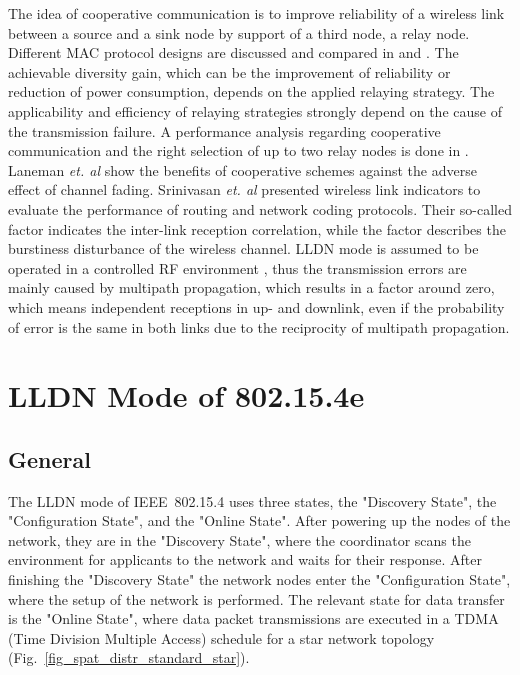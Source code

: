 \documentclass[times,10pt,twocolumn]{article}
\begin{document}
The idea of cooperative communication is to improve reliability of a wireless link between a source and a sink node by support of a third node, a relay node. Different MAC protocol designs are discussed and compared in \cite{cooperative_diversity_in_WLAN_and_WSN} and \cite{cooperative_protocols_survey}. The achievable diversity gain, which can be the improvement of reliability or reduction of power consumption, depends on the applied relaying strategy. The applicability and efficiency of relaying strategies strongly depend on the cause of the transmission failure. A performance analysis regarding cooperative communication and the right selection of up to two relay nodes is done in \cite{performance_of_relay_selection}. Laneman \textit{et. al} \cite{cooperative_diversity} show the benefits of cooperative schemes against the adverse effect of channel fading. Srinivasan \textit{et. al} \cite{srinivasan_kappa_factor} \cite{srinivasan_beta_factor} presented wireless link indicators to evaluate the performance of routing and network coding protocols. Their so-called  factor indicates the inter-link reception correlation, while the  factor describes the burstiness disturbance of the wireless channel. LLDN mode is assumed to be operated in a controlled RF environment \cite{IEEE_STD_802.15.4e-2012}, thus the transmission errors are mainly caused by multipath propagation, which results in a  factor around zero, which means independent receptions in up- and downlink, even if the probability of error is the same in both links due to the reciprocity of multipath propagation.

\section{LLDN Mode of 802.15.4e}
\label{section_LLDN_mode}
\subsection{General}
\label{subsection_LLDN_mode_general}

The LLDN mode of IEEE~802.15.4 uses three states, the "Discovery State", the "Configuration State", and the "Online State". After powering up the nodes of the network, they are in the "Discovery State", where the coordinator scans the environment for applicants to the network and waits for their response. After finishing the "Discovery State" the network nodes enter the "Configuration State", where the setup of the network is performed. The relevant state for data transfer is the "Online State", where data packet transmissions are executed in a TDMA (Time Division Multiple Access) schedule for a star network topology (Fig.~\ref{fig_spat_distr_standard_star}).
\end{document}
